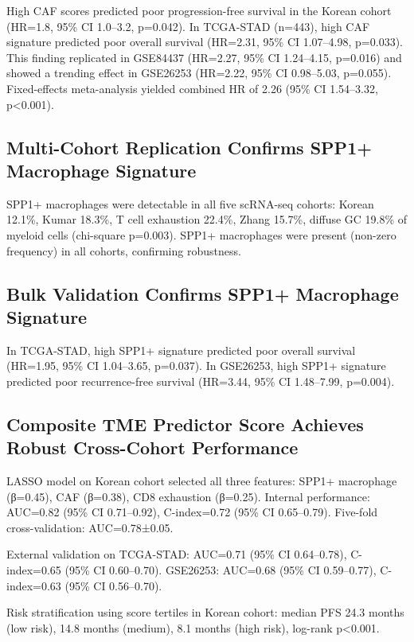 \documentclass[12pt,twoside]{article}
\begin{document}
High CAF scores predicted poor progression-free survival in the Korean cohort (HR=1.8, 95\% CI 1.0--3.2, p=0.042). In TCGA-STAD (n=443), high CAF signature predicted poor overall survival (HR=2.31, 95\% CI 1.07--4.98, p=0.033). This finding replicated in GSE84437 (HR=2.27, 95\% CI 1.24--4.15, p=0.016) and showed a trending effect in GSE26253 (HR=2.22, 95\% CI 0.98--5.03, p=0.055). Fixed-effects meta-analysis yielded combined HR of 2.26 (95\% CI 1.54--3.32, p<0.001).

\subsection{Multi-Cohort Replication Confirms SPP1+ Macrophage Signature}

SPP1+ macrophages were detectable in all five scRNA-seq cohorts: Korean 12.1\%, Kumar 18.3\%, T cell exhaustion 22.4\%, Zhang 15.7\%, diffuse GC 19.8\% of myeloid cells (chi-square p=0.003). SPP1+ macrophages were present (non-zero frequency) in all cohorts, confirming robustness.

\subsection{Bulk Validation Confirms SPP1+ Macrophage Signature}

In TCGA-STAD, high SPP1+ signature predicted poor overall survival (HR=1.95, 95\% CI 1.04--3.65, p=0.037). In GSE26253, high SPP1+ signature predicted poor recurrence-free survival (HR=3.44, 95\% CI 1.48--7.99, p=0.004).

\subsection{Composite TME Predictor Score Achieves Robust Cross-Cohort Performance}

LASSO model on Korean cohort selected all three features: SPP1+ macrophage (β=0.45), CAF (β=0.38), CD8 exhaustion (β=0.25). Internal performance: AUC=0.82 (95\% CI 0.71--0.92), C-index=0.72 (95\% CI 0.65--0.79). Five-fold cross-validation: AUC=0.78±0.05.

External validation on TCGA-STAD: AUC=0.71 (95\% CI 0.64--0.78), C-index=0.65 (95\% CI 0.60--0.70). GSE26253: AUC=0.68 (95\% CI 0.59--0.77), C-index=0.63 (95\% CI 0.56--0.70).

Risk stratification using score tertiles in Korean cohort: median PFS 24.3 months (low risk), 14.8 months (medium), 8.1 months (high risk), log-rank p<0.001.
\end{document}
